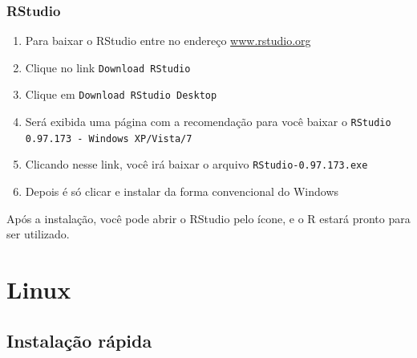 \documentclass[a4paper,12pt]{article}\usepackage[]{graphicx}\usepackage[]{color}
\providecommand{\R}{\textsf{R}\xspace}
\providecommand{\RStudio}{\textsf{RStudio}\xspace}
\begin{document}
\subsubsection{\RStudio}

\begin{enumerate}
\item Para baixar o \RStudio entre no endereço
  \url{www.rstudio.org}
\item Clique no link \texttt{Download RStudio}
\item Clique em \texttt{Download RStudio Desktop}
\item Será exibida uma página com a recomendação para você baixar o
  \texttt{RStudio 0.97.173 - Windows XP/Vista/7}
\item Clicando nesse link, você irá baixar o arquivo
  \texttt{RStudio-0.97.173.exe}
\item Depois é só clicar e instalar da forma convencional do Windows
\end{enumerate}

Após a instalação, você pode abrir o \RStudio pelo ícone, e o \R estará
pronto para ser utilizado.

\section{Linux}

\subsection{Instalação rápida}
\label{sec:irl}
\end{document}
